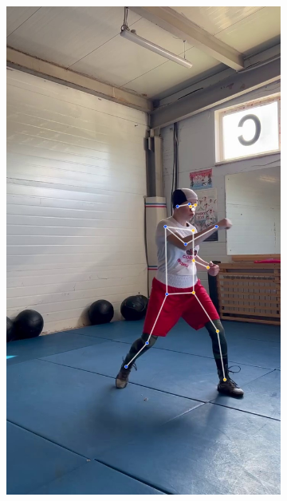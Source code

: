 \begin{figure}[h]
\begin{subfigure}[b]{0.24\textwidth}
	\includegraphics[width=\textwidth]{./images/data_info/box_examples/ex_9}
\end{subfigure}
\begin{subfigure}[b]{0.24\textwidth}
	\centering

\end{subfigure}
\end{figure}
